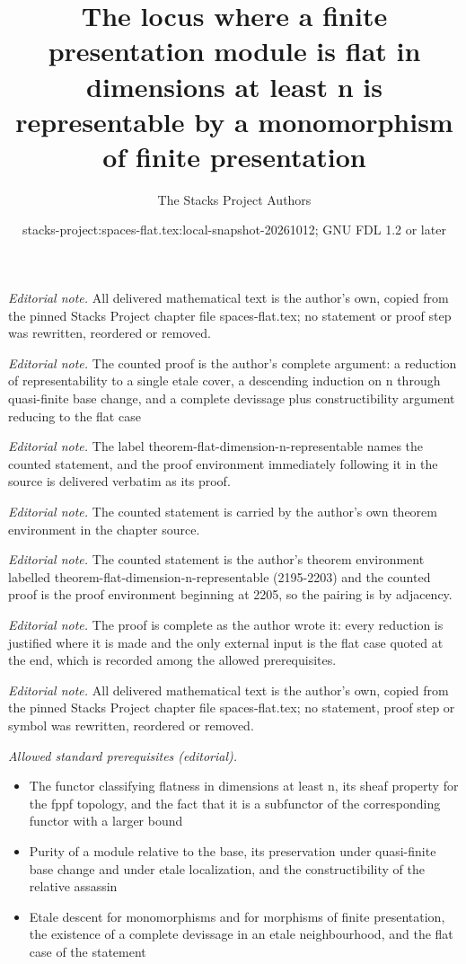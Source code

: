 \documentclass[10pt,a4paper]{amsart}
\title{The locus where a finite presentation module is flat in dimensions at least n is representable by a monomorphism of finite presentation}
\author{The Stacks Project Authors}
\date{stacks-project:spaces-flat.tex:local-snapshot-20261012; GNU FDL 1.2 or later}
\theoremstyle{plain}
\theoremstyle{definition}
\theoremstyle{remark}
\numberwithin{equation}{subsection}
\begin{document}
\maketitle
\noindent\textit{Editorial note.} All delivered mathematical text is the author's own, copied from the pinned Stacks Project chapter file spaces-flat.tex; no statement or proof step was rewritten, reordered or removed.\par\medskip
\noindent\textit{Editorial note.} The counted proof is the author's complete argument: a reduction of representability to a single etale cover, a descending induction on n through quasi-finite base change, and a complete devissage plus constructibility argument reducing to the flat case\par\medskip
\noindent\textit{Editorial note.} The label theorem-flat-dimension-n-representable names the counted statement, and the proof environment immediately following it in the source is delivered verbatim as its proof.\par\medskip
\noindent\textit{Editorial note.} The counted statement is carried by the author's own theorem environment in the chapter source.\par\medskip
\noindent\textit{Editorial note.} The counted statement is the author's theorem environment labelled theorem-flat-dimension-n-representable (2195-2203) and the counted proof is the proof environment beginning at 2205, so the pairing is by adjacency.\par\medskip
\noindent\textit{Editorial note.} The proof is complete as the author wrote it: every reduction is justified where it is made and the only external input is the flat case quoted at the end, which is recorded among the allowed prerequisites.\par\medskip
\noindent\textit{Editorial note.} All delivered mathematical text is the author's own, copied from the pinned Stacks Project chapter file spaces-flat.tex; no statement, proof step or symbol was rewritten, reordered or removed.\par\medskip
\noindent\textit{Allowed standard prerequisites (editorial).}\begin{itemize}
\item The functor classifying flatness in dimensions at least n, its sheaf property for the fppf topology, and the fact that it is a subfunctor of the corresponding functor with a larger bound
\item Purity of a module relative to the base, its preservation under quasi-finite base change and under etale localization, and the constructibility of the relative assassin
\item Etale descent for monomorphisms and for morphisms of finite presentation, the existence of a complete devissage in an etale neighbourhood, and the flat case of the statement
\end{itemize}\medskip
\end{document}
